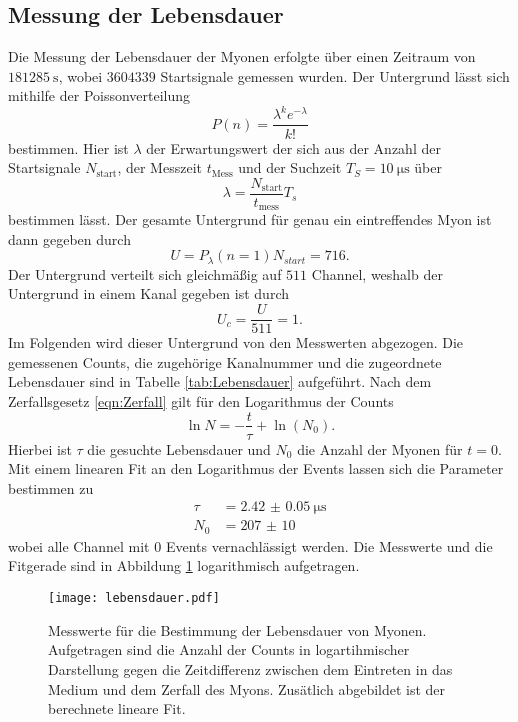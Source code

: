 \subsection{Messung der Lebensdauer}
Die Messung der Lebensdauer der Myonen erfolgte über einen Zeitraum von $\SI{181285}{\second}$, wobei $3604339$ Startsignale gemessen wurden. 
Der Untergrund lässt sich mithilfe der Poissonverteilung 
\begin{equation*}
    P(n) = \frac{\lambda^k e^{-\lambda}}{k!}
\end{equation*}
bestimmen. Hier ist $\lambda$ der Erwartungswert der sich aus der Anzahl der Startsignale $N_\text{start}$, der Messzeit $t_\text{Mess}$ und der Suchzeit $T_S = \SI{10}{\micro\second}$ über 
\begin{equation*}
    \lambda = \frac{N_\text{start}}{t_\text{mess}} T_s  
\end{equation*}
bestimmen lässt. Der gesamte Untergrund für genau ein eintreffendes Myon ist dann gegeben durch 
\begin{equation*}
    U = P_{\lambda}(n=1) N_{start} = \num{716}  .
\end{equation*}
Der Untergrund verteilt sich gleichmäßig auf $511$ Channel, weshalb der Untergrund in einem Kanal gegeben ist durch 
\begin{equation*}
    U_c = \frac{U}{511} =\num{1}  .
\end{equation*}
Im Folgenden wird dieser Untergrund von den Messwerten abgezogen.
Die gemessenen Counts, die zugehörige Kanalnummer und die zugeordnete Lebensdauer sind in Tabelle \ref{tab:Lebensdauer} aufgeführt.
Nach dem Zerfallsgesetz \ref{eqn:Zerfall} gilt für den Logarithmus der Counts 
\begin{equation*}
    \ln N = -\frac{t}{\tau} + \ln(N_0).
\end{equation*}
Hierbei ist $\tau $ die gesuchte Lebensdauer und $N_0$ die Anzahl der Myonen für $t=0$. Mit einem linearen Fit an den Logarithmus der Events lassen sich die Parameter bestimmen zu 
\begin{align*}
    \tau &= \SI{2.42(5)}{\micro\second} \\
    N_0 &= \num{207(10)}
\end{align*}
wobei alle Channel mit $0$ Events vernachlässigt werden.
Die Messwerte und die Fitgerade sind in Abbildung \ref{fig:Lebensdauer} logarithmisch aufgetragen.
\begin{figure}
    \centering 
    \texttt{[image: lebensdauer.pdf]}
    \caption{Messwerte für die Bestimmung der Lebensdauer von Myonen. Aufgetragen sind die Anzahl der Counts in logartihmischer Darstellung gegen die 
    Zeitdifferenz zwischen dem Eintreten in das Medium und dem Zerfall des Myons. 
    Zusätlich abgebildet ist der berechnete lineare Fit.}
    \label{fig:Lebensdauer}
\end{figure}

